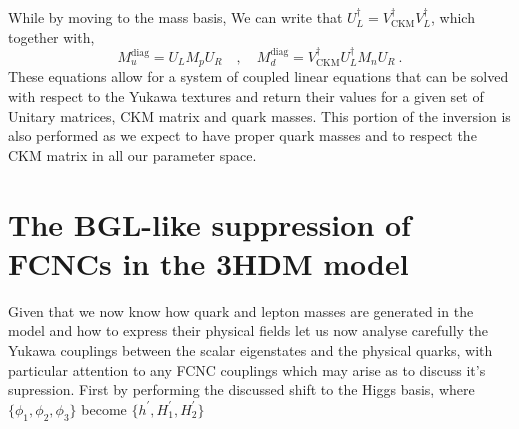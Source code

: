 \documentclass[10pt]{book}
\renewcommand{\(}{\left(}
\renewcommand{\)}{\right)}
\renewcommand{\[}{\left[}
\renewcommand{\]}{\right]}
\begin{document}
%
While by moving to the mass basis, 
%
We can write that $U_L^\dagger = V^\dagger_{\text{CKM}} V_L^\dagger$, which together with,
\begin{equation}
M_u^{\text{diag}}  = U_L M_p U_R  \quad , \quad M_d^{\text{diag}}  = V^\dagger_{\text{CKM}} U_L^\dagger M_n U_R \ . 
\end{equation} 
%
These equations allow for a system of coupled linear equations that can be solved with respect to the Yukawa textures and return their values for a given set of Unitary matrices, CKM matrix and quark masses. 
%
This portion of the inversion is also performed as we expect to have proper quark masses and to respect the CKM matrix in all our parameter space.
% 

\section{The BGL-like suppression of FCNCs in the 3HDM model}

Given that we now know how quark and lepton masses are generated in the model and how to express their physical fields let us now analyse carefully the Yukawa couplings between the scalar eigenstates and the physical quarks, with particular attention to any FCNC couplings which may arise as to discuss it's supression.
%
First by performing the discussed shift to the Higgs basis, where $\{\phi_1 , \phi_2 , \phi_3\}$ become $\{h^\prime , H_1^\prime , H_2^\prime \}$ 
\end{document}
